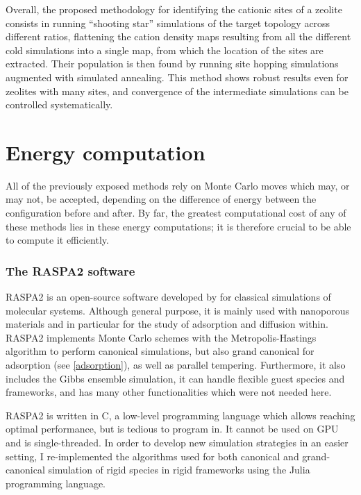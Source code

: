 \documentclass[main.tex]{subfiles}
\begin{document}
Overall, the proposed methodology for identifying the cationic sites of a zeolite consists in running ``shooting star'' simulations of the target topology across different \SiAl ratios, flattening the cation density maps resulting from all the different cold simulations into a single map, from which the location of the sites are extracted. Their population is then found by running site hopping simulations augmented with simulated annealing. This method shows robust results even for zeolites with many sites, and convergence of the intermediate simulations can be controlled systematically.

\section{Energy computation}\label{energy_computation}

All of the previously exposed methods rely on Monte Carlo moves which may, or may not, be accepted, depending on the difference of energy between the configuration before and after. By far, the greatest computational cost of any of these methods lies in these energy computations; it is therefore crucial to be able to compute it efficiently.

\subsubsection{The RASPA2 software}

RASPA2 is an open-source software developed by \textcite{RASPA} for classical simulations of molecular systems. Although general purpose, it is mainly used with nanoporous materials and in particular for the study of adsorption and diffusion within. RASPA2 implements Monte Carlo schemes with the Metropolis-Hastings algorithm to perform canonical simulations, but also grand canonical for adsorption (see \cref{adsorption}), as well as parallel tempering. Furthermore, it also includes the Gibbs ensemble simulation, it can handle flexible guest species and frameworks, and has many other functionalities which were not needed here.

RASPA2 is written in C, a low-level programming language which allows reaching optimal performance, but is tedious to program in. It cannot be used on GPU and is single-threaded. In order to develop new simulation strategies in an easier setting, I re-implemented the algorithms used for both canonical and grand-canonical simulation of rigid species in rigid frameworks using the Julia programming language\autocite{Julia,JuliaDesign}.
\end{document}
